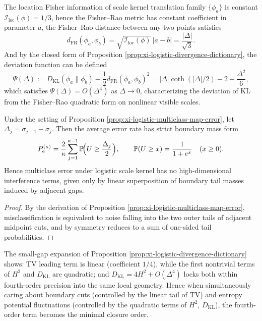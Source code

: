 \begin{remark}\label{rem:xi-logistic-fisher-rao-and-curvature}
The location Fisher information of scale kernel translation family \(\{\phi_a\}\) is constant \(\mathcal I_{\mathrm{loc}}(\phi)=1/3\), hence the Fisher--Rao metric has constant coefficient in parameter \(a\),
the Fisher--Rao distance between any two points satisfies
\[
d_{\mathrm{FR}}(\phi_a,\phi_b)=\sqrt{\mathcal I_{\mathrm{loc}}(\phi)}\,|a-b|=\frac{|\Delta|}{\sqrt3}.
\]
And by the closed form of Proposition \ref{prop:xi-logistic-divergence-dictionary}, the deviation function can be defined
\[
\Psi(\Delta):=D_{\mathrm{KL}}(\phi_a\|\phi_b)-\frac{1}{2}d_{\mathrm{FR}}(\phi_a,\phi_b)^{2}
=|\Delta|\coth(|\Delta|/2)-2-\frac{\Delta^{2}}{6},
\]
which satisfies \(\Psi(\Delta)=O(\Delta^{4})\) as \(\Delta\to 0\), characterizing the deviation of KL from the Fisher--Rao quadratic form on nonlinear visible scales.
\end{remark}
\begin{corollary}\label{cor:xi-logistic-boundary-mass-error}
Under the setting of Proposition \ref{prop:xi-logistic-multiclass-map-error}, let \(\Delta_j=\sigma_{j+1}-\sigma_j\).
Then the average error rate has strict boundary mass form
\[
P_{\mathrm e}^{(\kappa)}
=\frac{2}{\kappa}\sum_{j=1}^{\kappa-1}\mathbb P\!\Bigl(U\ge \frac{\Delta_j}{2}\Bigr),
\qquad
\mathbb P(U\ge x)=\frac{1}{1+e^{x}}\quad(x\ge 0).
\]
Hence multiclass error under logistic scale kernel has no high-dimensional interference terms, given only by linear superposition of boundary tail masses induced by adjacent gaps.
\end{corollary}
\begin{proof}
By the derivation of Proposition \ref{prop:xi-logistic-multiclass-map-error}, misclassification is equivalent to noise falling into the two outer tails of adjacent midpoint cuts, and by symmetry reduces to a sum of one-sided tail probabilities.
\end{proof}
\begin{remark}\label{rem:xi-logistic-fourth-order-closure}
The small-gap expansion of Proposition \ref{prop:xi-logistic-divergence-dictionary} shows: \(\mathrm{TV}\) leading term is linear (coefficient \(1/4\)), while the first nontrivial terms of \(H^{2}\) and \(D_{\mathrm{KL}}\) are quadratic;
and \(D_{\mathrm{KL}}=4H^{2}+O(\Delta^{4})\) locks both within fourth-order precision into the same local geometry.
Hence when simultaneously caring about boundary cuts (controlled by the linear tail of \(\mathrm{TV}\)) and entropy potential fluctuations (controlled by the quadratic terms of \(H^{2}\), \(D_{\mathrm{KL}}\)), the fourth-order term becomes the minimal closure order.
\end{remark}
